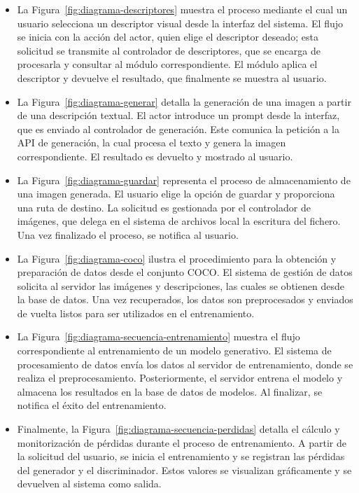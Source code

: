 \begin{itemize}
    \item La Figura~\ref{fig:diagrama-descriptores} muestra el proceso mediante el cual un usuario selecciona un descriptor visual desde la interfaz del sistema. El flujo se inicia con la acción del actor, quien elige el descriptor deseado; esta solicitud se transmite al controlador de descriptores, que se encarga de procesarla y consultar al módulo correspondiente. El módulo aplica el descriptor y devuelve el resultado, que finalmente se muestra al usuario.
    
    \item La Figura~\ref{fig:diagrama-generar} detalla la generación de una imagen a partir de una descripción textual. El actor introduce un prompt desde la interfaz, que es enviado al controlador de generación. Este comunica la petición a la API de generación, la cual procesa el texto y genera la imagen correspondiente. El resultado es devuelto y mostrado al usuario.

    \item La Figura~\ref{fig:diagrama-guardar} representa el proceso de almacenamiento de una imagen generada. El usuario elige la opción de guardar y proporciona una ruta de destino. La solicitud es gestionada por el controlador de imágenes, que delega en el sistema de archivos local la escritura del fichero. Una vez finalizado el proceso, se notifica al usuario.

    \item La Figura~\ref{fig:diagrama-coco} ilustra el procedimiento para la obtención y preparación de datos desde el conjunto COCO. El sistema de gestión de datos solicita al servidor las imágenes y descripciones, las cuales se obtienen desde la base de datos. Una vez recuperados, los datos son preprocesados y enviados de vuelta listos para ser utilizados en el entrenamiento.

    \item La Figura~\ref{fig:diagrama-secuencia-entrenamiento} muestra el flujo correspondiente al entrenamiento de un modelo generativo. El sistema de procesamiento de datos envía los datos al servidor de entrenamiento, donde se realiza el preprocesamiento. Posteriormente, el servidor entrena el modelo y almacena los resultados en la base de datos de modelos. Al finalizar, se notifica el éxito del entrenamiento.

    \item Finalmente, la Figura~\ref{fig:diagrama-secuencia-perdidas} detalla el cálculo y monitorización de pérdidas durante el proceso de entrenamiento. A partir de la solicitud del usuario, se inicia el entrenamiento y se registran las pérdidas del generador y el discriminador. Estos valores se visualizan gráficamente y se devuelven al sistema como salida.
\end{itemize}

